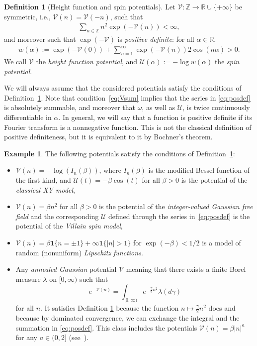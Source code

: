 \documentclass[11pt, reqno]{amsart}
\numberwithin{equation}{section}
\theoremstyle{definition}
\newtheorem{definition}{Definition}
\newtheorem{example}{Example}
\theoremstyle{remark}
\renewcommand{\c}[1]{\ensuremath{\mathcal{#1}}}
\begin{document}
\begin{definition}[Height function and spin potentials] \label{def:potential}
Let $\mathcal V: \mathbb Z\to \mathbb R \cup \{ +\infty\}$ be symmetric, i.e., $\mathcal V (n)=\mathcal V(-n)$, such that 
\begin{align} \label{eq:Vsum}
\sum_{n\in \mathbb Z}n^2 \exp(-\mathcal V(n))<\infty,
\end{align}
and moreover such that $\exp(-\mathcal V)$
is \emph{positive definite}: for all $\alpha\in \mathbb R$, 
\begin{align}\label{eq:posdef}
	w(\alpha):=\exp(-\mathcal V(0))+\sum_{n=1}^{\infty}\exp(-\mathcal V(n))2\cos( n\alpha) > 0.
\end{align}
We call $\mathcal V$ the \emph{height function potential}, and $\mathcal U (\alpha) := -\log w(\alpha)$ the \emph{spin potential}.
\end{definition}
We will always assume that the considered potentials satisfy the conditions of Definition~\ref{def:potential}.
Note that condition~\eqref{eq:Vsum} implies that the series in \eqref{eq:posdef} is absolutely summable, and moreover that $\omega$, as well as $\mathcal U$, is twice continuously differentiable in $\alpha$.
In general, we will say that a function is positive definite if its Fourier transform is a nonnegative function.
This is not the classical definition of positive definiteness, but it is equivalent to it by Bochner's theorem.
\begin{example} \label{exple:potentials}The following potentials satisfy the conditions of Definition~\ref{def:potential}:
\begin{itemize}
\item  $\mathcal V(n)= -\log(I_{n}(\beta))$, where $I_n(\beta)$ is the modified Bessel function of the first kind, and $\c{U}(t) = -\beta \cos( t)$ for all $\beta>0$ is the potential of the \emph{classical XY model},
\item $\mathcal V(n)=\beta n^2$ for all $\beta >0$ is the potential of the \emph{integer-valued Gaussian free field} and the corresponding $\mathcal U$ defined through the series in~\eqref{eq:posdef} is the potential of the \emph{Villain spin model},
\item  $\mathcal V(n)=\beta \mathbf 1\{ n=\pm 1\}+\infty  \mathbf 1\{ |n|>1\}$ for $\exp(-\beta)<1/2$ is a model of random (nonuniform) \emph{Lipschitz functions}.
\item
	Any \emph{annealed Gaussian} potential $\c{V}$ meaning that there exists a finite Borel measure $\lambda$ on $[0, \infty)$ such that
\[
	e^{-\c{V}(n)} = \int_{[0, \infty)} e^{-\frac{\gamma}{2} n^2} \lambda(d \gamma)
\]
for all $n$. 
It satisfies Definition \ref{def:potential} because the function $n \mapsto \frac{\gamma}{2} n^2$ does and because by dominated convergence, we can exchange the integral and the summation in \eqref{eq:posdef}.  
This class includes the potentials $\c{V}(n) = \beta |n|^a$ for any $a \in (0, 2]$ (see~\cite{AHPS}). 
\end{itemize}
\end{example}
\end{document}
